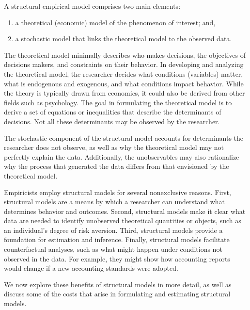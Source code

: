 A structural empirical model comprises two main elements:
\begin{enumerate}
\item a theoretical (economic) model of the phenomenon of interest; and,
\item a stochastic model that links the theoretical model to the observed
data.
\end{enumerate}

The theoretical model minimally describes who makes decisions, the objectives of decisions makers, and constraints on their behavior.
In developing and analyzing the theoretical model, the researcher decides what conditions (variables) matter,  what is endogenous and exogenous, and what conditions impact behavior.
While the theory is typically drawn from economics, it could also be derived from other fields such as psychology.
The goal in formulating the theoretical model is to derive a set of equations or inequalities that describe the determinants of decisions.
Not all these determinants may be observed by the researcher.

The stochastic component of the structural model accounts for determinants the researcher does not observe, as well as why the theoretical model may not perfectly explain the data.  
Additionally, the unobservables may also rationalize why the process that generated the data differs from that envisioned by the theoretical model.

Empiricists employ structural models for several nonexclusive reasons.
First, structural models are a means by which a researcher can understand what determines behavior and outcomes. 
Second, structural models make it clear what data are needed to identify unobserved theoretical quantities or objects, such as an individual's degree of risk aversion. 
Third, structural models provide a foundation for estimation and inference. 
Finally, structural models facilitate counterfactual analyses, such as what might happen under conditions not observed in the data. 
For example, they might show how accounting reports would change if a new accounting standards were adopted. 
 
We now explore these benefits of structural models in more detail, as well as discuss some of the costs that arise in formulating and estimating structural models.


